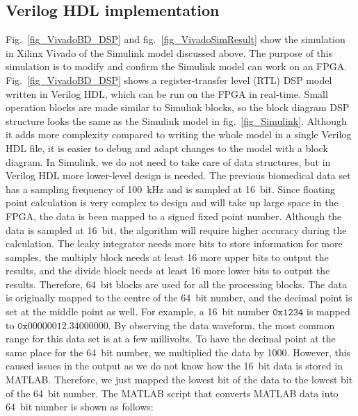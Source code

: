 \subsection{Verilog HDL implementation}

Fig.~\ref{fig_VivadoBD_DSP} and fig.~\ref{fig_VivadoSimResult} show the simulation in Xilinx Vivado of the Simulink model discussed above.  The purpose of this simulation is to modify and confirm the Simulink model can work on an FPGA.  Fig.~\ref{fig_VivadoBD_DSP} shows a register-transfer level (RTL) DSP model written in Verilog HDL, which can be run on the FPGA in real-time.  Small operation blocks are made similar to Simulink blocks, so the block diagram DSP structure looks the same as the Simulink model in fig.~\ref{fig_Simulink}.  Although it adds more complexity compared to writing the whole model in a single Verilog HDL file, it is easier to debug and adapt changes to the model with a block diagram.  In Simulink, we do not need to take care of data structures, but in Verilog HDL more lower-level design is needed.  The previous biomedical data set has a sampling frequency of \qty{100}{kHz} and is sampled at \qty{16}{bit}.  Since floating point calculation is very complex to design and will take up large space in the FPGA, the data is been mapped to a signed fixed point number.   Although the data is sampled at \qty{16}{bit}, the algorithm will require higher accuracy during the calculation.  The leaky integrator needs more bits to store information for more samples, the multiply block needs at least 16 more upper bits to output the results, and the divide block needs at least 16 more lower bits to output the results.  Therefore, \qty{64}{bit} blocks are used for all the processing blocks.  The data is originally mapped to the centre of the \qty{64}{bit} number, and the decimal point is set at the middle point as well.  For example, a \qty{16}{bit} number $\mathtt{0x1234}$ is mapped to $\mathtt{0x00000012.34000000}$.  By observing the data waveform, the most common range for this data set is at a few millivolts.  To have the decimal point at the same place for the \qty{64}{bit} number, we multiplied the data by 1000.  However, this caused issues in the output as we do not know how the \qty{16}{bit} data is stored in MATLAB.  Therefore, we just mapped the lowest bit of the data to the lowest bit of the \qty{64}{bit} number.  The MATLAB script that converts MATLAB data into \qty{64}{bit} number is shown as follows:

